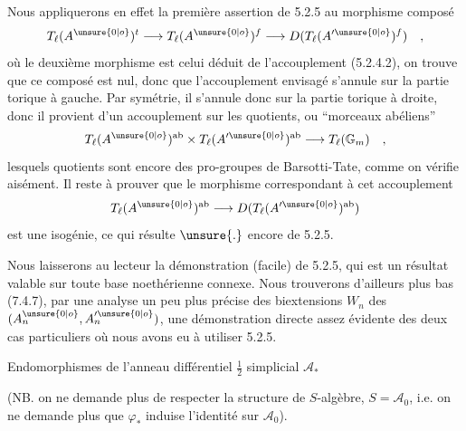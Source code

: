 Nous appliquerons en effet la première assertion de 5.2.5 au morphisme composé
\[
T_\ell(A^{\unsure{0|o}})^t\longrightarrow T_\ell(A^{\unsure{0|o}})^f\longrightarrow D(T_\ell(A'^{\unsure{0|o}})^f)\quad ,
\]
où le deuxième morphisme est celui déduit de l'accouplement (5.2.4.2), on trouve que ce composé est nul, donc que l'accouplement envisagé s'annule sur la partie torique à gauche. Par symétrie, il s'annule donc sur la partie torique à droite, donc il provient d'un accouplement sur les quotients, ou ``morceaux abéliens''
\[
T_\ell(A^{\unsure{0|o}})^{\mathrm{ab}}\times T_\ell(A'^{\unsure{0|o}})^{\mathrm{ab}}\longrightarrow T_\ell(\mathbb G_m)\quad ,
\]
lesquels quotients sont encore des pro-groupes de Barsotti-Tate, comme on vérifie aisément. Il reste à prouver que le morphisme correspondant à cet accouplement
\[
T_\ell(A^{\unsure{0|o}})^{\mathrm{ab}}\longrightarrow D(T_\ell(A'^{\unsure{0|o}})^{\mathrm{ab}})
\]
est une isogénie, ce qui résulte $\unsure{.}$ encore de 5.2.5.

Nous laisserons au lecteur la démonstration (facile) de 5.2.5, qui est un résultat valable sur toute base noethérienne connexe. Nous trouverons d'ailleurs plus bas (7.4.7), par une analyse un peu plus précise des biextensions $W_n$ des $(A_n^{\unsure{0|o}},A_n'^{\unsure{0|o}})$, une démonstration directe assez évidente des deux cas particuliers où nous avons eu à utiliser 5.2.5.

Endomorphismes de l'anneau différentiel $\frac12$ simplicial $\mathcal A_*$

(NB. on ne demande plus de respecter la structure de $S$-algèbre, $S=\mathcal A_0$, i.e. on ne demande plus que $\varphi_*$ induise l'identité sur $\mathcal A_0$).

